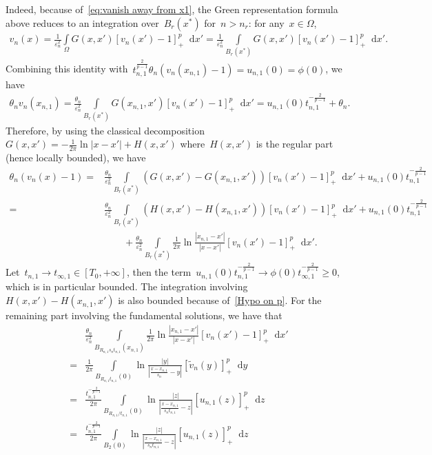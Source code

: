 \documentclass[10pt]{amsart}
\newcommand{\parenthesis}[1]{\left(#1\right)} %
\newcommand{\dd}{\mathop{}\!\mathrm{d}}
\newcommand{\eps}{\varepsilon}
\renewcommand{\to}{\rightarrow}
\begin{document}
    Indeed, because of~\eqref{eq:vanish away from x1}, the Green representation formula above reduces to an
    integration over~$B_r(x^*)$ for~$n> n_r$: for any~$x\in \Omega$,
    \begin{align*}
        v_n(x)=\frac{1}{\eps_n^2}\int\limits_{\Omega} G(x,x')[v_n(x')-1]_+^p\dd{x'}
        =\frac{1}{\eps_n^2}\int\limits_{B_r(x^*)} G(x,x')[v_n(x')-1]_+^p\dd{x'}.
    \end{align*}
    Combining this identity with~$t_{n,1}^{\frac{2}{p-1}}\theta_n (v_n(x_{n,1})-1)=u_{n,1}(0)=\phi(0)$, we have
    \begin{align*}
        \theta_n v_n(x_{n,1})
        = \frac{\theta_n}{\eps_n^2}\int\limits_{B_r(x^*)} G(x_{n,1},x')[v_n(x')-1]_+^p\dd{x'}
        =u_{n,1}(0)t_{n,1}^{-\frac{2}{p-1}}+\theta_n.
    \end{align*}
    Therefore, by using the classical decomposition $G(x,x')=-\frac{1}{2\pi}\ln|x-x'| + H(x,x')$ where~$H(x,x')$ is the regular part (hence locally bounded),
    we have
    \begin{align*}
        \theta_n (v_n(x)- 1)
        =&\frac{\theta_n}{\eps_n^2} \int\limits_{B_r(x^*)} \parenthesis{G(x,x')-G(x_{n,1},x')}[v_n(x')-1]_+^p\dd{x'} + u_{n,1}(0)t_{n,1}^{-\frac{2}{p-1}} \\
        =&\frac{\theta_n}{\eps_n^2} \int\limits_{B_r(x^*)} \parenthesis{H(x,x')-H(x_{n,1},x')}[v_n(x')-1]_+^p\dd{x'} + u_{n,1}(0)t_{n,1}^{-\frac{2}{p-1}} \\
        & \qquad+ \frac{\theta_n}{\eps_n^2} \int\limits_{B_r(x^*)} \frac{1}{2\pi}\ln\frac{|x_{n,1}-x'|}{|x-x'|} [v_n(x')-1]_+^p\dd{x'} .
    \end{align*}
    Let~$t_{n,1}\to t_{\infty,1} \in [T_0, +\infty]$, then the term~$u_{n,1}(0)t_{n,1}^{-\frac{2}{p-1}}\to \phi(0)t_{\infty,1}^{-\frac{2}{p-1}}\geq 0$, which is in particular bounded.
    The integration involving~$H(x,x')-H(x_{n,1},x')$ is also bounded because of~\eqref{Hypo on p}.
    For the remaining part involving the fundamental solutions, we have that
    \begin{align*}
        &\frac{\theta_n}{\eps_n^2} \int\limits_{B_{R_{n,1}s_n t_{n,1}}(x_{n,1})} \frac{1}{2\pi}\ln\frac{|x_{n,1}-x'|}{|x-x'|} [v_n(x')-1]_+^p\dd{x'}\\
        =&\frac{1}{2\pi}\int\limits_{B_{R_{n,1} t_{n,1}} (0) } \ln\frac{|y|}{|\frac{x-x_{n,1}}{s_n} -y|} [\tilde{v}_n(y)]_+^p\dd{y}\\
        =&\frac{t_{n,1}^{-\frac{2}{p-1}} }{2\pi}\int\limits_{B_{R_{n,1} /t_{n,1} } (0)} \ln \frac{|z|}{|\frac{x-x_{n,1}}{s_n t_{n,1}} - z | }
        [u_{n,1}(z)]_+^p\dd z\\
        =&\frac{t_{n,1}^{-\frac{2}{p-1}} }{2\pi}\int\limits_{B_2 (0)} \ln \frac{|z|}{|\frac{x-x_{n,1}}{s_n t_{n,1}} - z | } [u_{n,1}(z)]_+^p\dd z
    \end{align*}
\end{document}
